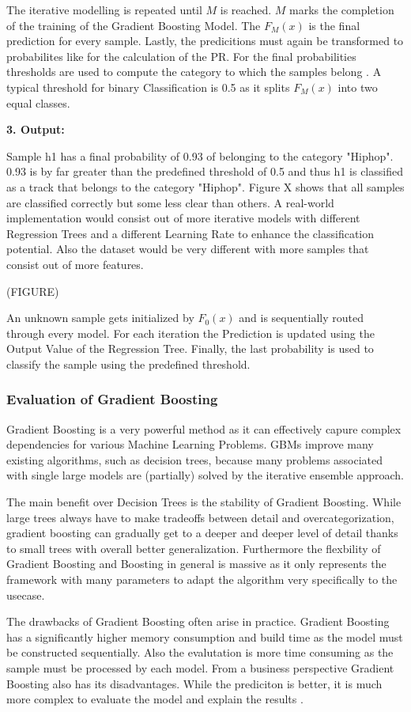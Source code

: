 The iterative modelling is repeated until \(M\) is reached. \(M\) marks the completion of the training of the Gradient 
Boosting Model. The \(F_{M}(x)\) is the final prediction for every sample. Lastly, the predicitions
must again be transformed to probabilites like for the calculation of the PR. For the final probabilities 
thresholds are used to compute the category to which the samples belong \cite[p.1204]{Friedman_2001}. A typical threshold 
for binary Classification is 0.5 as it splits \(F_{M}(x)\) into two equal classes.

\textbf{3. Output:}

Sample h1 has a final probability of 0.93 of belonging to the category "Hiphop". 0.93 is by far greater than the 
predefined threshold of 0.5 and thus h1 is classified as a track that belongs to the category "Hiphop". Figure X shows
that all samples are classified correctly but some less clear than others. A real-world implementation would consist 
out of more iterative models with different Regression Trees and a different Learning Rate to enhance the 
classification potential. Also the dataset would be very different with more samples that consist out of more features. 

(FIGURE)

An unknown sample gets initialized by \(F_{0}(x)\) and is sequentially routed through every model. For each iteration the 
Prediction is updated using the Output Value of the Regression Tree. Finally, the last probability is used to classify 
the sample using the predefined threshold. 

\subsubsection{Evaluation of Gradient Boosting}

Gradient Boosting is a very powerful method as it can effectively capure complex dependencies for various Machine 
Learning Problems. GBMs improve many existing algorithms, such as decision trees, because many problems associated 
with single large models are (partially) solved by the iterative ensemble approach. 

The main benefit over Decision Trees is the stability of Gradient Boosting. While large trees always have to make tradeoffs 
between detail and overcategorization, gradient boosting can gradually get to a deeper and deeper level of detail thanks to 
small trees with overall better generalization. Furthermore the flexbility of Gradient Boosting and Boosting in general is massive 
as it only represents the framework with many parameters to adapt the algorithm very specifically to the usecase.  

The drawbacks of Gradient Boosting often arise in practice. Gradient Boosting has a significantly higher memory consumption and 
build time as the model must be constructed sequentially. Also the evalutation is more time consuming as the sample must be processed 
by each model. From a business perspective Gradient Boosting also has its disadvantages. While the prediciton is better, it is much 
more complex to evaluate the model and explain the results \cite[7.2]{Natekin2013}. 